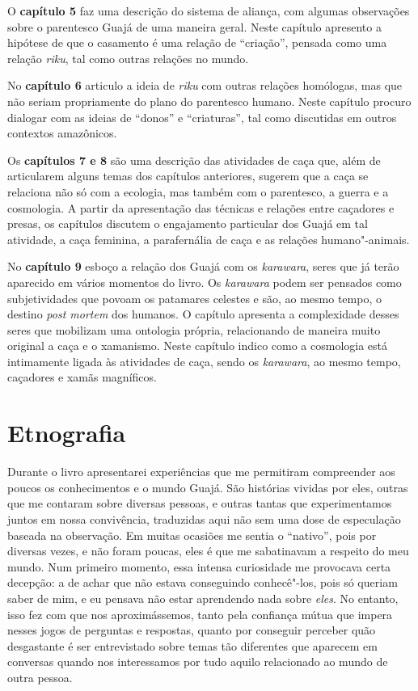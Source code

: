 O \textbf{capítulo 5} faz uma descrição do sistema de aliança, com
algumas observações sobre o parentesco Guajá de uma maneira geral. Neste
capítulo apresento a hipótese de que o casamento é uma relação de
``criação'', pensada como uma relação \emph{riku}, tal como outras
relações no mundo.

No \textbf{capítulo 6} articulo a ideia de \emph{riku} com outras relações homólogas, mas que não seriam
propriamente do plano do parentesco humano. Neste capítulo procuro
dialogar com as ideias de ``donos'' e ``criaturas'', tal como discutidas em
outros contextos amazônicos.

Os \textbf{capítulos 7 e 8} são uma descrição das atividades de caça
que, além de articularem alguns temas dos capítulos anteriores, sugerem
que a caça se relaciona não só com a ecologia, mas também com o
parentesco, a guerra e a cosmologia. A partir da apresentação das
técnicas e relações entre caçadores e presas, os capítulos discutem o
engajamento particular dos Guajá em tal atividade, a caça feminina, a
parafernália de caça e as relações humano"-animais.

No \textbf{capítulo 9} esboço a relação dos Guajá com os
\emph{karawara}, seres que já terão aparecido em vários momentos do
livro. Os \emph{karawara} podem ser pensados como subjetividades que
povoam os patamares celestes e são, ao mesmo tempo, o destino \emph{post
mortem} dos humanos. O capítulo apresenta a complexidade desses seres
que mobilizam uma ontologia própria, relacionando de maneira muito
original a caça e o xamanismo. Neste capítulo indico como a
cosmologia está intimamente ligada às atividades de caça, sendo os
\emph{karawara}, ao mesmo tempo, caçadores e xamãs magníficos.

\section{Etnografia}\label{etnografia}

Durante o livro apresentarei experiências que me permitiram compreender
aos poucos os conhecimentos e o mundo Guajá. São histórias vividas por
eles, outras que me contaram sobre diversas pessoas, e outras tantas que
experimentamos juntos em nossa convivência, traduzidas aqui não sem uma
dose de especulação baseada na observação. Em muitas ocasiões me sentia
o ``nativo'', pois por diversas vezes, e não foram poucas, eles é que me
sabatinavam a respeito do meu mundo. Num primeiro momento, essa intensa
curiosidade me provocava certa decepção: a de achar que não estava
conseguindo conhecê"-los, pois só queriam saber de mim, e eu pensava não
estar aprendendo nada sobre \emph{eles}. No entanto, isso fez com que
nos aproximássemos, tanto pela confiança mútua que impera nesses jogos
de perguntas e respostas, quanto por conseguir perceber quão desgastante
é ser entrevistado sobre temas tão diferentes que aparecem em conversas
quando nos interessamos por tudo aquilo relacionado ao mundo de outra
pessoa.

